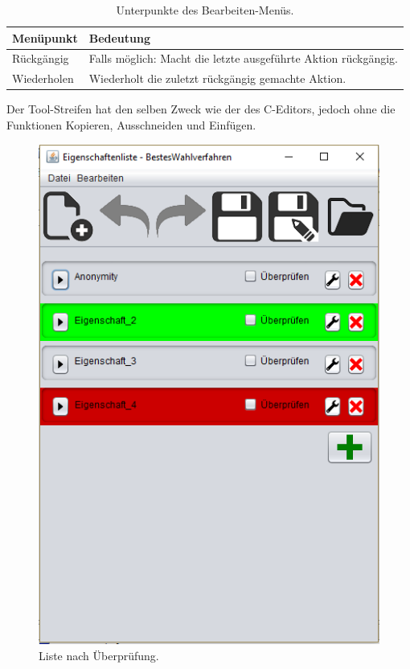 \documentclass[a4paper]{scrreprt}
\begin{document}
\begin{table}[H]
\begin{tabular}{|p{3cm}|p{12cm}|}
Menüpunkt & Bedeutung \\
\hline
Rückgängig & Falls möglich: Macht die letzte ausgeführte Aktion rückgängig.\\
\hline
Wiederholen & Wiederholt die zuletzt rückgängig gemachte Aktion.
\end{tabular}
\label{Eigenschaftenliste-Bearbeiten-Menüpunkte}
\caption{Unterpunkte des Bearbeiten-Menüs.}
\end{table}

Der Tool-Streifen hat den selben Zweck wie der des C-Editors, jedoch ohne die Funktionen Kopieren, Ausschneiden und Einfügen.

\begin{figure}[H]
\begin{minipage}{.5\textwidth}
  \centering
  \includegraphics[scale=0.5]{nach-testen.png}
  \caption{Liste nach Überprüfung.}
  \label{fig:sub1}
\end{minipage}

\end{figure}
\end{document}
